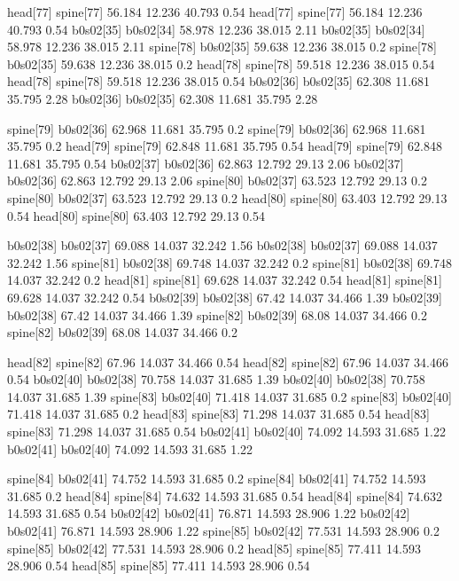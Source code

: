 head[77]    spine[77]    56.184    12.236    40.793    0.54
head[77]    spine[77]    56.184    12.236    40.793    0.54
b0s02[35]    b0s02[34]    58.978    12.236    38.015    2.11
b0s02[35]    b0s02[34]    58.978    12.236    38.015    2.11
spine[78]    b0s02[35]    59.638    12.236    38.015    0.2
spine[78]    b0s02[35]    59.638    12.236    38.015    0.2
head[78]    spine[78]    59.518    12.236    38.015    0.54
head[78]    spine[78]    59.518    12.236    38.015    0.54
b0s02[36]    b0s02[35]    62.308    11.681    35.795    2.28
b0s02[36]    b0s02[35]    62.308    11.681    35.795    2.28


spine[79]    b0s02[36]    62.968    11.681    35.795    0.2
spine[79]    b0s02[36]    62.968    11.681    35.795    0.2
head[79]    spine[79]    62.848    11.681    35.795    0.54
head[79]    spine[79]    62.848    11.681    35.795    0.54
b0s02[37]    b0s02[36]    62.863    12.792    29.13    2.06
b0s02[37]    b0s02[36]    62.863    12.792    29.13    2.06
spine[80]    b0s02[37]    63.523    12.792    29.13    0.2
spine[80]    b0s02[37]    63.523    12.792    29.13    0.2
head[80]    spine[80]    63.403    12.792    29.13    0.54
head[80]    spine[80]    63.403    12.792    29.13    0.54


b0s02[38]    b0s02[37]    69.088    14.037    32.242    1.56
b0s02[38]    b0s02[37]    69.088    14.037    32.242    1.56
spine[81]    b0s02[38]    69.748    14.037    32.242    0.2
spine[81]    b0s02[38]    69.748    14.037    32.242    0.2
head[81]    spine[81]    69.628    14.037    32.242    0.54
head[81]    spine[81]    69.628    14.037    32.242    0.54
b0s02[39]    b0s02[38]    67.42    14.037    34.466    1.39
b0s02[39]    b0s02[38]    67.42    14.037    34.466    1.39
spine[82]    b0s02[39]    68.08    14.037    34.466    0.2
spine[82]    b0s02[39]    68.08    14.037    34.466    0.2


head[82]    spine[82]    67.96    14.037    34.466    0.54
head[82]    spine[82]    67.96    14.037    34.466    0.54
b0s02[40]    b0s02[38]    70.758    14.037    31.685    1.39
b0s02[40]    b0s02[38]    70.758    14.037    31.685    1.39
spine[83]    b0s02[40]    71.418    14.037    31.685    0.2
spine[83]    b0s02[40]    71.418    14.037    31.685    0.2
head[83]    spine[83]    71.298    14.037    31.685    0.54
head[83]    spine[83]    71.298    14.037    31.685    0.54
b0s02[41]    b0s02[40]    74.092    14.593    31.685    1.22
b0s02[41]    b0s02[40]    74.092    14.593    31.685    1.22


spine[84]    b0s02[41]    74.752    14.593    31.685    0.2
spine[84]    b0s02[41]    74.752    14.593    31.685    0.2
head[84]    spine[84]    74.632    14.593    31.685    0.54
head[84]    spine[84]    74.632    14.593    31.685    0.54
b0s02[42]    b0s02[41]    76.871    14.593    28.906    1.22
b0s02[42]    b0s02[41]    76.871    14.593    28.906    1.22
spine[85]    b0s02[42]    77.531    14.593    28.906    0.2
spine[85]    b0s02[42]    77.531    14.593    28.906    0.2
head[85]    spine[85]    77.411    14.593    28.906    0.54
head[85]    spine[85]    77.411    14.593    28.906    0.54


